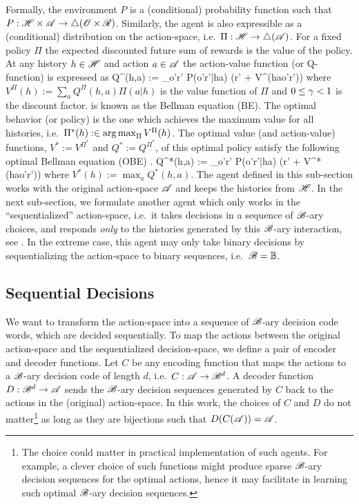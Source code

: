 \documentclass{article} %
\begin{document}
Formally, the environment $P$ is a (conditional) probability function such that $P : \mathscr{H} \times \mathscr{A} \to \triangle(\mathscr{O} \times \mathscr{R})$. Similarly, the agent is also expressible as a (conditional) distribution on the action-space, i.e.\ $\Pi: \mathscr{H} \to \triangle(\mathscr{A})$. For a fixed policy $\Pi$ the expected discounted future sum of rewards is the value of the policy. At any history $h \in \mathscr{H}$ and action $a \in \mathscr{A}$ the action-value function (or Q-function) is expressed as
\beq\label{eq:bellman}
Q^\Pi(h,a) := \sum_{o'r'} P(o'r'|ha) \left(r' + \g V^\Pi(hao'r')\right)
\eeq
where $V^\Pi(h) := \sum_a Q^\Pi(h,a)\Pi(a|h)$ is the value function of $\Pi$ and $0\leq\gamma<1$ is the discount factor.  is known as the Bellman equation (BE). The optimal behavior (or policy) is the one which achieves the maximum value for all histories, i.e.\ $\Pi^*(h) :\in \operatorname*{arg\,max}_{\Pi} V^\Pi(h)$. The optimal value (and action-value) functions, $V^* := V^{\Pi^*}$ and $Q^* := Q^{\Pi^*}$, of this optimal policy satisfy the following optimal Bellman equation (OBE) \cite{Hutter2016,Sutton2018}.
\beq
Q^*(h,a) := \sum_{o'r'} P(o'r'|ha) \left(r' + \g V^*(hao'r')\right)\label{eq:obe}
\eeq
where $V^*(h) := \max_a Q^*(h,a)$. The agent defined in this sub-section works with the original action-space $\mathscr{A}$ and keeps the histories from $\mathscr{H}$. In the next sub-section, we formulate another agent which only works in the ``sequentialized'' action-space, i.e.\ it takes decisions in a sequence of $\mathscr{B}$-ary choices, and responds \emph{only} to the histories generated by this $\mathscr{B}$-ary interaction, see . In the extreme case, this agent may only take binary decisions by sequentializing the action-space to binary sequences, i.e.\ $\mathscr{B} = \mathbb{B}$.

\subsection{Sequential Decisions}

We want to transform the action-space into a sequence of $\mathscr{B}$-ary decision code words, which are decided sequentially. To map the actions between the original action-space and the sequentialized decision-space, we define a pair of encoder and decoder functions. Let $C$ be any encoding function that maps the actions to a $\mathscr{B}$-ary decision code of length $d$, i.e.\ $C : \mathscr{A} \to \mathscr{B}^d$. A decoder function $D : \mathscr{B}^d \to \mathscr{A}$ sends the $\mathscr{B}$-ary decision sequences generated by $C$ back to the actions in the (original) action-space.
In this work, the choices of $C$ and $D$ do not matter\footnote{The choice could matter in practical implementation of such agents. For example, a clever choice of such functions might produce sparse $\mathscr{B}$-ary decision sequences for the optimal actions, hence it may facilitate in learning such optimal $\mathscr{B}$-ary decision sequences.} as long as they are bijections such that $D(C(\mathscr{A})) = \mathscr{A}$.
\end{document}

